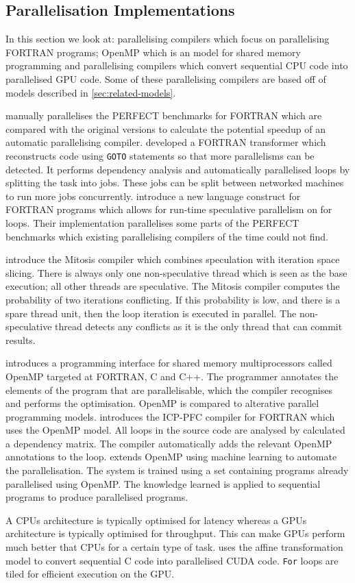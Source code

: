 \subsection{Parallelisation Implementations}
In this section we look at: parallelising compilers which focus on parallelising FORTRAN programs; OpenMP which is an model for shared memory programming and parallelising compilers which convert sequential CPU code into parallelised GPU code. Some of these parallelising compilers are based off of models described in \autoref{sec:related-models}.

\textcite{Eigenmann1998} manually parallelises the PERFECT benchmarks for FORTRAN which are compared with the original versions to calculate the potential speedup of an automatic parallelising compiler.
\textcite{DHollander1998} developed a FORTRAN transformer which reconstructs code using \texttt{GOTO} statements so that more parallelisms can be detected. It performs dependency analysis and automatically parallelised loops by splitting the task into jobs. These jobs can be split between networked machines to run more jobs concurrently.
\textcite{Rauchwerger1999} introduce a new language construct for FORTRAN programs which allows for run-time speculative parallelism on for loops. Their implementation parallelises some parts of the PERFECT benchmarks which existing parallelising compilers of the time could not find.

\textcite{Quinones2005} introduce the Mitosis compiler which combines speculation with iteration space slicing. There is always only one non-speculative thread which is seen as the base execution; all other threads are speculative. The Mitosis compiler computes the probability of two iterations conflicting. If this probability is low, and there is a spare thread unit, then the loop iteration is executed in parallel. The non-speculative thread detects any conflicts as it is the only thread that can commit results.

\textcite{Dagum1998} introduces a programming interface for shared memory multiprocessors called OpenMP targeted at FORTRAN, C and C++. The programmer annotates the elements of the program that are parallelisable, which the compiler recognises and performs the optimisation. OpenMP is compared to alterative parallel programming models.
\textcite{Kim2000} introduces the ICP-PFC compiler for FORTRAN which uses the OpenMP model. All loops in the source code are analysed by calculated a dependency matrix. The compiler automatically adds the relevant OpenMP annotations to the loop.
\textcite{Lam2011} extends OpenMP using machine learning to automate the parallelisation. The system is trained using a set containing programs already parallelised using OpenMP. The knowledge learned is applied to sequential programs to produce parallelised programs.

A CPUs architecture is typically optimised for latency whereas a GPUs architecture is typically optimised for throughput. This can make GPUs perform much better that CPUs for a certain type of task. \textcite{Baskaran2010} uses the affine transformation model to convert sequential C code into parallelised CUDA code. \texttt{For} loops are tiled for efficient execution on the GPU.
